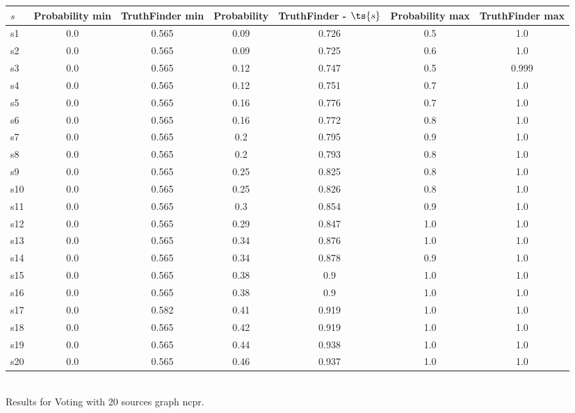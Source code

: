 \documentclass{article}
\begin{document}
\noindent\begin{tabular}{|l|c|c|c|c|c|c|}
\hline
$s$& Probability min & TruthFinder min & Probability & TruthFinder - $\ts{s}$ & Probability max & TruthFinder max\\
\hline
s1 &0.0 & 0.565 & 0.09 & 0.726 & 0.5 & 1.0\\
\hline
s2 &0.0 & 0.565 & 0.09 & 0.725 & 0.6 & 1.0\\
\hline
s3 &0.0 & 0.565 & 0.12 & 0.747 & 0.5 & 0.999\\
\hline
s4 &0.0 & 0.565 & 0.12 & 0.751 & 0.7 & 1.0\\
\hline
s5 &0.0 & 0.565 & 0.16 & 0.776 & 0.7 & 1.0\\
\hline
s6 &0.0 & 0.565 & 0.16 & 0.772 & 0.8 & 1.0\\
\hline
s7 &0.0 & 0.565 & 0.2 & 0.795 & 0.9 & 1.0\\
\hline
s8 &0.0 & 0.565 & 0.2 & 0.793 & 0.8 & 1.0\\
\hline
s9 &0.0 & 0.565 & 0.25 & 0.825 & 0.8 & 1.0\\
\hline
s10 &0.0 & 0.565 & 0.25 & 0.826 & 0.8 & 1.0\\
\hline
s11 &0.0 & 0.565 & 0.3 & 0.854 & 0.9 & 1.0\\
\hline
s12 &0.0 & 0.565 & 0.29 & 0.847 & 1.0 & 1.0\\
\hline
s13 &0.0 & 0.565 & 0.34 & 0.876 & 1.0 & 1.0\\
\hline
s14 &0.0 & 0.565 & 0.34 & 0.878 & 0.9 & 1.0\\
\hline
s15 &0.0 & 0.565 & 0.38 & 0.9 & 1.0 & 1.0\\
\hline
s16 &0.0 & 0.565 & 0.38 & 0.9 & 1.0 & 1.0\\
\hline
s17 &0.0 & 0.582 & 0.41 & 0.919 & 1.0 & 1.0\\
\hline
s18 &0.0 & 0.565 & 0.42 & 0.919 & 1.0 & 1.0\\
\hline
s19 &0.0 & 0.565 & 0.44 & 0.938 & 1.0 & 1.0\\
\hline
s20 &0.0 & 0.565 & 0.46 & 0.937 & 1.0 & 1.0\\
\hline
\end{tabular}\\

\noindent Results for Voting with 20 sources graph ncpr.
\end{document}
